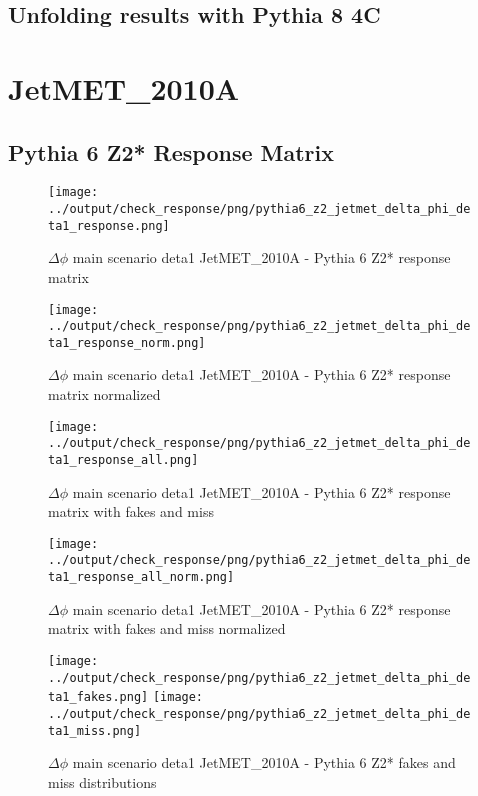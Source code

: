 \documentclass[11pt]{book}
\begin{document}
\clearpage
\subsection{Unfolding results with Pythia 8 4C}


\section{JetMET\_2010A}
\subsection{Pythia 6 Z2* Response Matrix}

\begin{figure}[ht]
\centering
\texttt{[image: ../output/check\_response/png/pythia6\_z2\_jetmet\_delta\_phi\_deta1\_response.png]}
\caption{$\Delta\phi$ main scenario deta1 JetMET\_2010A - Pythia 6 Z2* response matrix}
\label{p6_jetmet_delta_phi_deta1_response}
\end{figure}

\begin{figure}[ht]
\centering
\texttt{[image: ../output/check\_response/png/pythia6\_z2\_jetmet\_delta\_phi\_deta1\_response\_norm.png]}
\caption{$\Delta\phi$ main scenario deta1 JetMET\_2010A - Pythia 6 Z2* response matrix normalized}
\label{p6_jetmet_delta_phi_deta1_response_norm}
\end{figure}

\begin{figure}[ht]
\centering
\texttt{[image: ../output/check\_response/png/pythia6\_z2\_jetmet\_delta\_phi\_deta1\_response\_all.png]}
\caption{$\Delta\phi$ main scenario deta1 JetMET\_2010A - Pythia 6 Z2* response matrix with fakes and miss}
\label{p6_jetmet_delta_phi_deta1_response_all}
\end{figure}

\begin{figure}[ht]
\centering
\texttt{[image: ../output/check\_response/png/pythia6\_z2\_jetmet\_delta\_phi\_deta1\_response\_all\_norm.png]}
\caption{$\Delta\phi$ main scenario deta1 JetMET\_2010A - Pythia 6 Z2* response matrix with fakes and miss normalized}
\label{p6_jetmet_delta_phi_deta1_response_all_norm}
\end{figure}

\begin{figure}[ht]
\centering
\texttt{[image: ../output/check\_response/png/pythia6\_z2\_jetmet\_delta\_phi\_deta1\_fakes.png]}
\texttt{[image: ../output/check\_response/png/pythia6\_z2\_jetmet\_delta\_phi\_deta1\_miss.png]}
\caption{$\Delta\phi$ main scenario deta1 JetMET\_2010A - Pythia 6 Z2* fakes and miss distributions}
\label{p6_jetmet_delta_phi_deta1_fakesmiss}
\end{figure}
\end{document}
